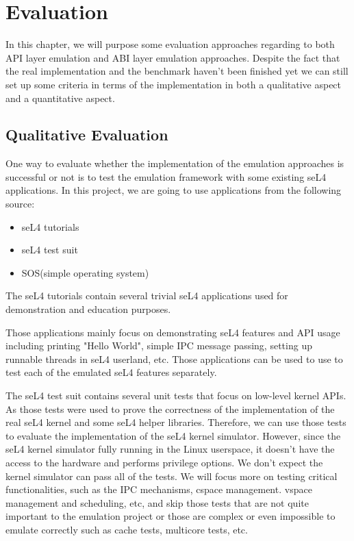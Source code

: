 \chapter{Evaluation}\label{ch:eval}

In this chapter, we will purpose some evaluation approaches regarding to both API layer emulation and ABI layer emulation approaches. Despite the fact that the real implementation and the benchmark haven't been finished yet we can still set up some criteria in terms of the implementation in both a qualitative aspect and a quantitative aspect. 

\section{Qualitative Evaluation} 

One way to evaluate whether the implementation of the emulation approaches is successful or not is to test the emulation framework with some existing seL4 applications. In this project, we are going to use applications from the following source:

\begin{itemize}
    \item seL4 tutorials
    \item seL4 test suit
    \item SOS(simple operating system)
\end{itemize}

The seL4 tutorials contain several trivial seL4 applications used for demonstration and education purposes.

Those applications mainly focus on demonstrating seL4 features and API usage including printing "Hello World", simple IPC message passing, setting up runnable threads in seL4 userland, etc. Those applications can be used to use to test each of the emulated seL4 features separately.

The seL4 test suit contains several unit tests that focus on low-level kernel APIs. As those tests were used to prove the correctness of the implementation of the real seL4 kernel and some seL4 helper libraries. Therefore, we can use those tests to evaluate the implementation of the seL4 kernel simulator. However, since the seL4 kernel simulator fully running in the Linux userspace, it doesn't have the access to the hardware and performs privilege options. We don't expect the kernel simulator can pass all of the tests. We will focus more on testing critical functionalities, such as the IPC mechanisms, cspace management. vspace management and scheduling, etc, and skip those tests that are not quite important to the emulation project or those are complex or even impossible to emulate correctly such as cache tests, multicore tests, etc.

